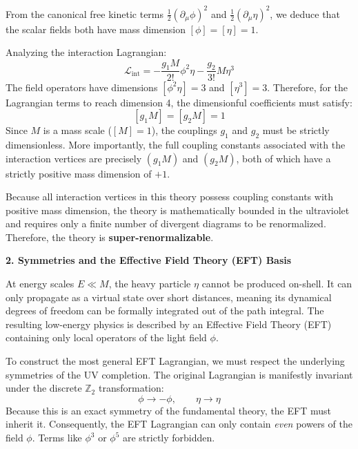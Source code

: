 From the canonical free kinetic terms $\frac{1}{2}(\partial_\mu \phi)^2$ and $\frac{1}{2}(\partial_\mu \eta)^2$, we deduce that the scalar fields both have mass dimension $[\phi] = [\eta] = 1$.

Analyzing the interaction Lagrangian:
\[
    \mathcal{L}_{\text{int}} = -\frac{g_1 M}{2!} \phi^2 \eta - \frac{g_2}{3!} M \eta^3
\]
The field operators have dimensions $[\phi^2 \eta] = 3$ and $[\eta^3] = 3$. Therefore, for the Lagrangian terms to reach dimension 4, the dimensionful coefficients must satisfy:
\[
    [g_1 M] = [g_2 M] = 1
\]
Since $M$ is a mass scale ($[M] = 1$), the couplings $g_1$ and $g_2$ must be strictly dimensionless. More importantly, the full coupling constants associated with the interaction vertices are precisely $(g_1 M)$ and $(g_2 M)$, both of which have a strictly positive mass dimension of $+1$.

Because all interaction vertices in this theory possess coupling constants with positive mass dimension, the theory is mathematically bounded in the ultraviolet and requires only a finite number of divergent diagrams to be renormalized. Therefore, the theory is \textbf{super-renormalizable}.

\textbf{2. Symmetries and the Effective Field Theory (EFT) Basis}

At energy scales $E \ll M$, the heavy particle $\eta$ cannot be produced on-shell. It can only propagate as a virtual state over short distances, meaning its dynamical degrees of freedom can be formally integrated out of the path integral. The resulting low-energy physics is described by an Effective Field Theory (EFT) containing only local operators of the light field $\phi$.

To construct the most general EFT Lagrangian, we must respect the underlying symmetries of the UV completion. The original Lagrangian is manifestly invariant under the discrete $\mathbb{Z}_2$ transformation:
\[
    \phi \to -\phi, \qquad \eta \to \eta
\]
Because this is an exact symmetry of the fundamental theory, the EFT must inherit it. Consequently, the EFT Lagrangian can only contain \textit{even} powers of the field $\phi$. Terms like $\phi^3$ or $\phi^5$ are strictly forbidden.

